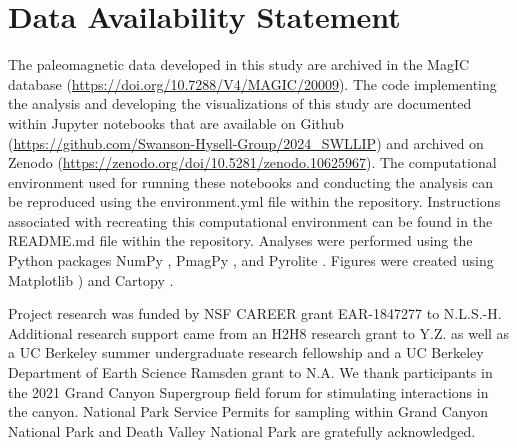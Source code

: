 \documentclass[draft]{agujournal2019}
\begin{document}
\section*{Data Availability Statement}
The paleomagnetic data developed in this study are archived in the MagIC database (\url{https://doi.org/10.7288/V4/MAGIC/20009}). The code implementing the analysis and developing the visualizations of this study are documented within Jupyter notebooks \cite{Kluyver2016a} that are available on Github (\url{https://github.com/Swanson-Hysell-Group/2024_SWLLIP}) and archived on Zenodo (\url{https://zenodo.org/doi/10.5281/zenodo.10625967}). The computational environment used for running these notebooks and conducting the analysis can be reproduced using the environment.yml file within the repository. Instructions associated with recreating this computational environment can be found in the README.md file within the repository. Analyses were performed using the Python packages NumPy \cite{Harris2020a}, PmagPy \cite{Tauxe2016a}, and Pyrolite \cite{Williams2020a}. Figures were created using Matplotlib \cite{Hunter2007a}) and Cartopy \cite{Met-Office2010a}.

\acknowledgments
Project research was funded by NSF CAREER grant EAR-1847277 to N.L.S.-H. Additional research support came from an H2H8 research grant to Y.Z. as well as a UC Berkeley summer undergraduate research fellowship and a UC Berkeley Department of Earth Science Ramsden grant to N.A. We thank participants in the 2021 Grand Canyon Supergroup field forum for stimulating interactions in the canyon. National Park Service Permits for sampling within Grand Canyon National Park and Death Valley National Park are gratefully acknowledged.


\nocite{Fisher1987a, Tauxe1991a, McFadden1990a, Haggerty1967a, Hedley1968a, McClelland1987a, McClelland1993a, Swanson-Hysell2011a, Driscoll2016b, Heslop2023a}





\end{document}
